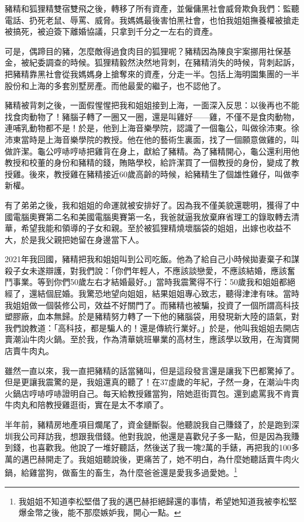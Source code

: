 豬精和狐狸精雙宿雙飛之後，轉移了所有資產，並僱傭黑社會威脅欺負我們：監聽電話、扔死老鼠、辱罵、威脅。我媽媽最後害怕黑社會，也怕我姐姐撫養權被搶走被搞死，被迫簽下離婚協議，只拿到千分之一左右的資產。

可是，偶蹄目的豬，怎麼敵得過食肉目的狐狸呢？豬精因為陳良宇案挪用社保基金，被紀委調查的時候。狐狸精毅然決然地背刺，在豬精消失的時候，背刺起訴，把豬精靠黑社會從我媽媽身上搶奪來的資產，分走一半。包括上海明園集團的一半股份和上海的多套別墅房產。而他最愛的繼子，也不認他了。

豬精被背刺之後，一面假惺惺把我和姐姐接到上海，一面深入反思：以後再也不能找食肉動物了！豬腦子轉了一圈又一圈，還是叫雞好——雞，不僅不是食肉動物，連哺乳動物都不是！於是，他到上海音樂學院，認識了一個龜公，叫做徐沛東。徐沛東當時是上海音樂學院的教授。他在他的藝術生裏面，找了一個願意做雞的，叫做許潔。龜公哼哧哼哧把雞背在身上，獻給了豬精。為了豬精開心，龜公還利用他教授和校董的身份和豬精的錢，賄賂學校，給許潔買了一個教授的身份，變成了教授雞。後來，教授雞在豬精接近60歲高齡的時候，給豬精生了個雄性雞仔，叫做李新權。

有了弟弟之後，我和姐姐的命運就被安排好了。因為我不僅美貌還聰明，獲得了中國電腦奧賽第二名和美國電腦奧賽第一名，我爸就逼我放棄麻省理工的錄取轉去清華，希望我能和領導的子女和親。至於被狐狸精燒壞腦袋的姐姐，出嫁也收益不大，於是我父親把她留在身邊當下人。

2021年我回國，豬精把我和姐姐叫到公司吃飯。他為了給自己小時候拋妻棄子和謀殺子女未遂辯護，對我們說：「你們年輕人，不應該談戀愛，不應該結婚，應該奮鬥事業。等到你們50歲左右才結婚最好。」當時我震驚得不行：50歲我和姐姐都絕經了，還結個屁婚。我驚恐地望向姐姐，結果姐姐專心致志，聽得津津有味。當時我姐姐做一個裝修公司，效益不好關門了。而豬精也被騙，投資了一個所謂高科技塑膠廠，血本無歸。於是豬精努力轉了一下他的豬腦袋，用發現新大陸的語氣，對我們說教道：「高科技，都是騙人的！還是傳統行業好。」於是，他叫我姐姐去開店賣潮汕牛肉火鍋。至於我，作為清華姚班畢業的高材生，應該學以致用，在淘寶開店賣牛肉丸。

雖然一直以來，我一直把豬精的話當豬叫，但是這段發言還是讓我下巴都驚掉了。但是更讓我震驚的是，我姐還真的聽了！在37虛歲的年紀，孑然一身，在潮汕牛肉火鍋店哼哧哼哧證明自己。每天給教授雞當狗，陪她逛街買包。還到處罵我不肯賣牛肉丸和陪教授雞逛街，實在是太不孝順了。

半年前，豬精房地產項目爛尾了，資金鏈斷裂。他聽說我自己賺錢了，於是跑到深圳我公司拜訪我，想跟我借錢。他對我說，他還是喜歡兒子多一點，但是因為我賺到錢，也喜歡我。他說了一堆好聽話，然後送了我一塊2萬的手錶，再把我的100多萬的邁巴赫開走了。我姐姐聽說後，更痛苦了，她不明白，為什麼她聽話賣牛肉火鍋，給雞當狗，做畜生的畜生，為什麼爸爸還是愛我多過愛她。\footnote{我姐姐不知道李松堅借了我的邁巴赫拒絕歸還的事情，希望她知道我被李松堅爆金幣之後，能不那麼嫉妒我，開心一點。}

